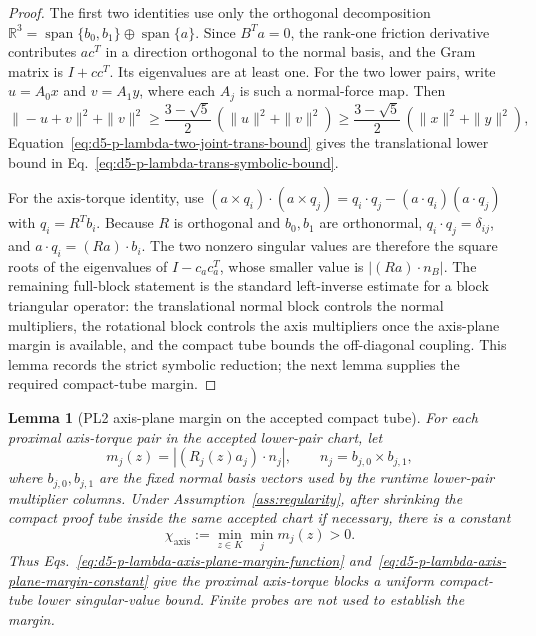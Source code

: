 \documentclass[preprint,12pt]{elsarticle}
\newtheorem{lemma}{Lemma}
\begin{document}
\begin{proof}
The first two identities use only the orthogonal decomposition
\(\mathbb R^3=\operatorname{span}\{b_0,b_1\}\oplus\operatorname{span}\{a\}\).
Since \(B^T a=0\), the rank-one friction derivative contributes
\(a c^T\) in a direction orthogonal to the normal basis, and the Gram matrix
is \(I+c c^T\).  Its eigenvalues are at least one.  For the two lower pairs,
write \(u=A_0x\) and \(v=A_1y\), where each \(A_j\) is such a normal-force
map.  Then
\begin{equation}
\label{eq:d5-p-lambda-two-joint-trans-bound}
  \|-u+v\|^2+\|v\|^2
  \ge \frac{3-\sqrt5}{2}\,(\|u\|^2+\|v\|^2)
  \ge \frac{3-\sqrt5}{2}\,(\|x\|^2+\|y\|^2),
\end{equation}
Equation~\eqref{eq:d5-p-lambda-two-joint-trans-bound} gives the
translational lower bound in
Eq.~\eqref{eq:d5-p-lambda-trans-symbolic-bound}.

For the axis-torque identity, use
\((a\times q_i)\cdot(a\times q_j)=q_i\cdot q_j-(a\cdot q_i)(a\cdot q_j)\)
with \(q_i=R^T b_i\).  Because \(R\) is orthogonal and \(b_0,b_1\) are
orthonormal, \(q_i\cdot q_j=\delta_{ij}\), and
\(a\cdot q_i=(Ra)\cdot b_i\).  The two nonzero singular values are therefore
the square roots of the eigenvalues of \(I-c_a c_a^T\), whose smaller value
is \(|(Ra)\cdot n_B|\).  The remaining full-block statement is the standard
left-inverse estimate for a block triangular operator: the translational
normal block controls the normal multipliers, the rotational block controls
the axis multipliers once the axis-plane margin is available, and the compact
tube bounds the off-diagonal coupling.  This lemma records the strict
symbolic reduction; the next lemma supplies the required compact-tube margin.
\end{proof}

\begin{lemma}[PL2 axis-plane margin on the accepted compact tube]
\label{lem:d5-p-lambda-pl2-axis-plane-margin}
For each proximal axis-torque pair in the accepted lower-pair chart, let
\begin{equation}
\label{eq:d5-p-lambda-axis-plane-margin-function}
  m_j(z)= |(R_j(z)a_j)\cdot n_j|,
  \qquad n_j=b_{j,0}\times b_{j,1},
\end{equation}
where \(b_{j,0},b_{j,1}\) are the fixed normal basis vectors used by the
runtime lower-pair multiplier columns.  Under
Assumption~\ref{ass:regularity}, after shrinking the compact proof tube
inside the same accepted chart if necessary, there is a constant
\begin{equation}
\label{eq:d5-p-lambda-axis-plane-margin-constant}
\chi_{\mathrm{axis}}
  :=\min_{z\in K}\min_j m_j(z)>0 .
\end{equation}
Thus Eqs.~\eqref{eq:d5-p-lambda-axis-plane-margin-function}
and~\eqref{eq:d5-p-lambda-axis-plane-margin-constant} give the proximal axis-torque blocks a uniform compact-tube lower
singular-value bound.  Finite probes are not used to establish the margin.
\end{lemma}
\end{document}
